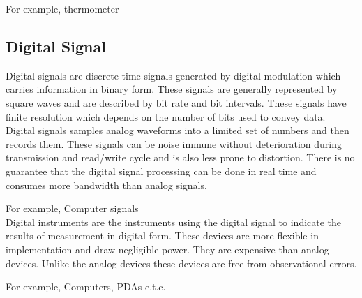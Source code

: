 \documentclass[12pt]{article}
\begin{document}
For example, thermometer

\subsection{Digital Signal}
Digital signals are discrete time signals generated by digital modulation which carries information in binary form. These signals are generally represented by square waves and are described by bit rate and bit intervals. These signals have finite resolution which depends on the number of bits used to convey data. Digital signals samples analog waveforms into a limited set of numbers and then records them. These signals can be noise immune without deterioration during transmission and read/write cycle and is also less prone to distortion. There is no guarantee that the digital signal processing can be done in real time and consumes more bandwidth than analog signals. 

For example, Computer signals\\

 Digital instruments are the instruments using the digital signal to indicate the results of measurement in digital form. These devices are more flexible in implementation and draw negligible power. They are expensive than analog devices. Unlike the analog devices these devices are free from observational errors. 
 
 For example, Computers, PDAs e.t.c.
\end{document}
